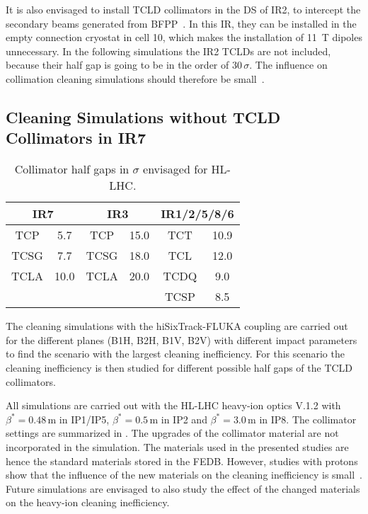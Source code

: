 It is also envisaged to install TCLD collimators in the DS of IR2, to intercept the secondary beams generated from BFPP~\cite{IPAC16:WEPMW030}. In this IR, they can be installed in the empty connection cryostat in cell 10, which makes the installation of 11~T dipoles unnecessary. In the following simulations the IR2 TCLDs are not included, because their half gap is going to be in the order of $30\,\sigma$. The influence on collimation cleaning simulations should therefore be small~\cite{mertens:private}.


\subsection{Cleaning Simulations without TCLD Collimators in IR7}

\begin{table}[htbp]
\centering
\caption{Collimator half gaps in $\sigma$ envisaged for HL-LHC.}
\label{tab:sets_hl}
\begin{tabular}{cccccc} 
\toprule
 \multicolumn{2}{c}{IR7}           &   \multicolumn{2}{c}{IR3}             &    \multicolumn{2}{c}{IR1/2/5/8/6} \\ \midrule
TCP    &  5.7  &   TCP   &  15.0    &    TCT  &   10.9 \\ 
TCSG   &  7.7  &   TCSG  &  18.0    &    TCL  &   12.0 \\
TCLA   & 10.0  &   TCLA  &  20.0    &   TCDQ  &   9.0  \\ 
       &       &         &          &   TCSP  &   8.5  \\ \bottomrule
\end{tabular}
\end{table}

The cleaning simulations with the hiSixTrack-FLUKA coupling are carried out for the different planes (B1H, B2H, B1V, B2V) with different impact parameters to find the scenario with the largest cleaning inefficiency. For this scenario the cleaning inefficiency is then studied for different possible half gaps of the TCLD collimators. 

All simulations are carried out with the HL-LHC heavy-ion optics V.1.2 with $\beta^*=0.48\,$m in IP1/IP5, $\beta^*=0.5\,$m in IP2 and $\beta^*=3.0\,$m in IP8. The collimator settings are summarized in . The upgrades of the collimator material are not incorporated in the simulation. The materials used in the presented studies are hence the standard materials stored in the FEDB. However, studies with protons show that the influence of the new materials on the cleaning inefficiency is small~\cite{IPAC16:WEPMW031}. Future simulations are envisaged to also study the effect of the changed materials on the heavy-ion cleaning inefficiency.


